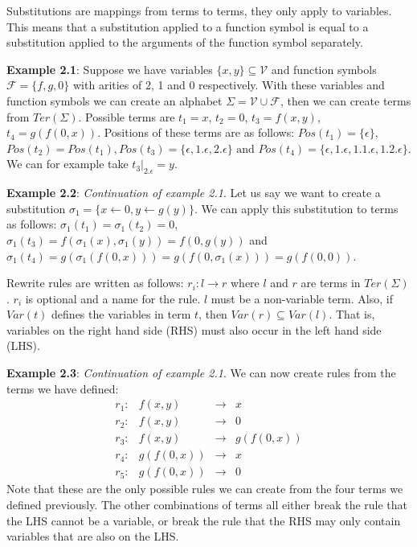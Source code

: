Substitutions are mappings from terms to terms, they only apply to variables. This means that a substitution applied to a function symbol is equal to a substitution applied to the arguments of the function symbol separately.

\textbf{Example 2.1}: Suppose we have variables $\{ x, y \} \subseteq \mathcal{V}$ and function symbols $\mathcal{F} = \{ f, g, 0\}$ with arities of 2, 1 and 0 respectively. With these variables and function symbols we can create an alphabet $\Sigma = \mathcal{V} \cup \mathcal{F}$, then we can create terms from $\textit{Ter}(\Sigma)$. Possible terms are $t_1 = x$, $t_2 = 0$, $t_3 = f(x, y)$, $t_4 = g(f(0, x))$. Positions of these terms are as follows: $\textit{Pos}(t_1) = \{ \epsilon \}$, $\textit{Pos}(t_2) = \textit{Pos}(t_1), \textit{Pos}(t_3) = \{ \epsilon, 1.\epsilon, 2.\epsilon \} \text{ and }\textit{Pos}(t_4) = \{ \epsilon, 1.\epsilon, 1.1.\epsilon, 1.2.\epsilon \}$. We can for example take $\left. t_3\right|_{2.\epsilon} = y$.

\textbf{Example 2.2}: \textit{Continuation of example 2.1}. Let us say we want to create a substitution $\sigma_1 = \{ x \leftarrow 0, y \leftarrow g(y) \}$. We can apply this substitution to terms as follows: $\sigma_1(t_1) = \sigma_1(t_2) = 0$, $\sigma_1(t_3) = f(\sigma_1(x), \sigma_1(y)) = f(0, g(y))$ and $\sigma_1(t_4) = g(\sigma_1(f(0, x))) = g(f(0, \sigma_1(x))) = g(f(0, 0))$.

Rewrite rules are written as follows: $r_i : l \rightarrow r$ where $l$ and $r$ are terms in $\textit{Ter}(\Sigma)$. $r_i$ is optional and a name for the rule. $l$ must be a non-variable term. Also, if $\textit{Var}(t)$ defines the variables in term $t$, then $\textit{Var}(r) \subseteq \textit{Var}(l)$. That is, variables on the right hand side (RHS) must also occur in the left hand side (LHS).

\textbf{Example 2.3}: \textit{Continuation of example 2.1}. We can now create rules from the terms we have defined:\newline
$$
\begin{array}{lrcl}
    r_1: & f(x, y) & \rightarrow & x \\
    r_2: & f(x, y) & \rightarrow & 0 \\
    r_3: & f(x, y) & \rightarrow & g(f(0, x))\\
    r_4: & g(f(0, x)) & \rightarrow & x\\
    r_5: & g(f(0, x)) & \rightarrow & 0
\end{array}
$$
Note that these are the only possible rules we can create from the four terms we defined previously. The other combinations of terms all either break the rule that the LHS cannot be a variable, or break the rule that the RHS may only contain variables that are also on the LHS.

